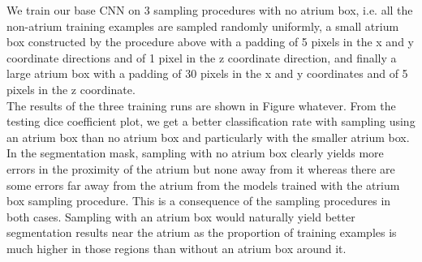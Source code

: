 \noindent We train our base CNN on 3 sampling procedures with no atrium box, i.e. all the non-atrium training examples are sampled randomly uniformly, a small atrium box constructed by the procedure above with a padding of 5 pixels in the x and y coordinate directions and of 1 pixel in the z coordinate direction, and finally a large atrium box with a padding of 30 pixels in the x and y coordinates and of 5 pixels in the z coordinate.\\

\noindent The results of the three training runs are shown in Figure whatever. From the testing dice coefficient plot, we get a better classification rate with sampling using an atrium box than no atrium box and particularly with the smaller atrium box. In the segmentation mask, sampling with no atrium box clearly yields more errors in the proximity of the atrium but none away from it whereas there are some errors far away from the atrium from the models trained with the atrium box sampling procedure. This is a consequence of the sampling procedures in both cases. Sampling with an atrium box would naturally yield better segmentation results near the atrium as the proportion of training examples is much higher in those regions than without an atrium box around it.\\




